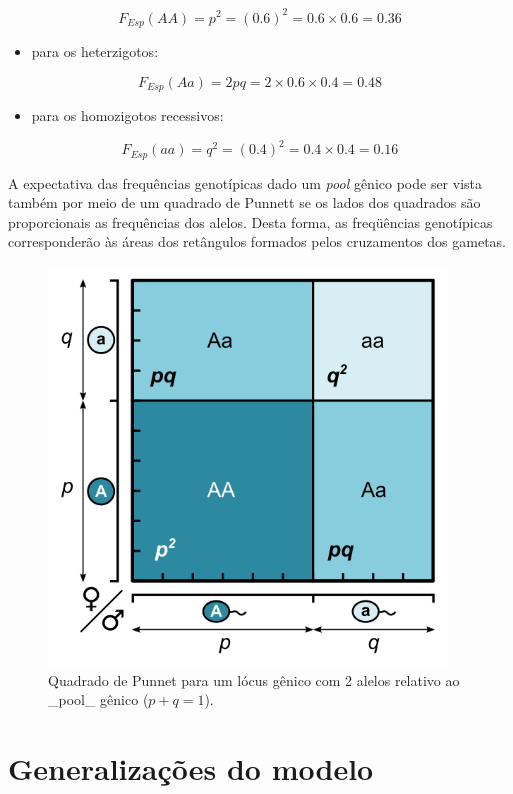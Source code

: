 \documentclass[
]{book}
\providecommand{\tightlist}{%
  \setlength{\itemsep}{0pt}\setlength{\parskip}{0pt}}
\begin{document}
\[F_{Esp}(AA) = p^2 = (0.6)^2 = 0.6 \times 0.6 = 0.36\]

\begin{itemize}
\tightlist
\item
  para os heterzigotos:
\end{itemize}

\[F_{Esp}(Aa) = 2pq = 2 \times 0.6 \times 0.4 = 0.48\]

\begin{itemize}
\tightlist
\item
  para os homozigotos recessivos:
\end{itemize}

\[F_{Esp}(aa) = q^2 = (0.4)^2 = 0.4 \times 0.4 = 0.16\]

A expectativa das frequências genotípicas dado um \emph{pool} gênico pode ser vista também por meio de um quadrado de Punnett se os lados dos quadrados são proporcionais as frequências dos alelos. Desta forma, as freqüências genotípicas corresponderão às áreas dos retângulos formados pelos cruzamentos dos gametas.

\begin{figure}

{\centering \includegraphics[width=400px]{figs/punnett_2alelles} 

}

\caption{Quadrado de Punnet para um lócus gênico com 2 alelos relativo ao _pool_ gênico ($p+q=1$).}\label{fig:hwpunnet2}
\end{figure}

\hypertarget{generalizauxe7uxf5es-do-modelo}{%
\section{Generalizações do modelo}\label{generalizauxe7uxf5es-do-modelo}}
\end{document}
